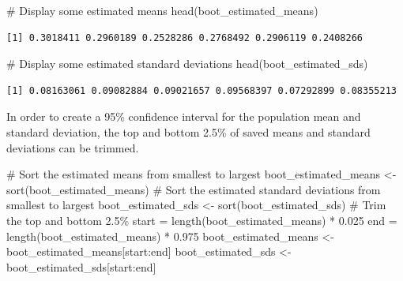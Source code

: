 \documentclass[
  letterpaper,
  DIV=11,
  numbers=noendperiod]{scrartcl}
\newenvironment{Shaded}{\begin{snugshade}}{\end{snugshade}}
\newcommand{\CommentTok}[1]{\textcolor[rgb]{0.37,0.37,0.37}{#1}}
\newcommand{\FloatTok}[1]{\textcolor[rgb]{0.68,0.00,0.00}{#1}}
\newcommand{\FunctionTok}[1]{\textcolor[rgb]{0.28,0.35,0.67}{#1}}
\newcommand{\NormalTok}[1]{\textcolor[rgb]{0.00,0.23,0.31}{#1}}
\newcommand{\OtherTok}[1]{\textcolor[rgb]{0.00,0.23,0.31}{#1}}
\newcommand{\SpecialCharTok}[1]{\textcolor[rgb]{0.37,0.37,0.37}{#1}}
\begin{document}
\begin{Shaded}
\begin{Highlighting}[]
\CommentTok{\# Display some estimated means}
\FunctionTok{head}\NormalTok{(boot\_estimated\_means)}
\end{Highlighting}
\end{Shaded}

\begin{verbatim}
[1] 0.3018411 0.2960189 0.2528286 0.2768492 0.2906119 0.2408266
\end{verbatim}

\begin{Shaded}
\begin{Highlighting}[]
\CommentTok{\# Display some estimated standard deviations}
\FunctionTok{head}\NormalTok{(boot\_estimated\_sds)}
\end{Highlighting}
\end{Shaded}

\begin{verbatim}
[1] 0.08163061 0.09082884 0.09021657 0.09568397 0.07292899 0.08355213
\end{verbatim}

In order to create a 95\% confidence interval for the population mean
and standard deviation, the top and bottom 2.5\% of saved means and
standard deviations can be trimmed.

\begin{Shaded}
\begin{Highlighting}[]
\CommentTok{\# Sort the estimated means from smallest to largest}
\NormalTok{boot\_estimated\_means }\OtherTok{\textless{}{-}} \FunctionTok{sort}\NormalTok{(boot\_estimated\_means)}
\CommentTok{\# Sort the estimated standard deviations from smallest to largest}
\NormalTok{boot\_estimated\_sds }\OtherTok{\textless{}{-}} \FunctionTok{sort}\NormalTok{(boot\_estimated\_sds)}
\CommentTok{\# Trim the top and bottom 2.5\%}
\NormalTok{start }\OtherTok{=} \FunctionTok{length}\NormalTok{(boot\_estimated\_means) }\SpecialCharTok{*} \FloatTok{0.025}
\NormalTok{end }\OtherTok{=} \FunctionTok{length}\NormalTok{(boot\_estimated\_means) }\SpecialCharTok{*} \FloatTok{0.975}
\NormalTok{boot\_estimated\_means }\OtherTok{\textless{}{-}}\NormalTok{ boot\_estimated\_means[start}\SpecialCharTok{:}\NormalTok{end]}
\NormalTok{boot\_estimated\_sds }\OtherTok{\textless{}{-}}\NormalTok{ boot\_estimated\_sds[start}\SpecialCharTok{:}\NormalTok{end]}
\end{Highlighting}
\end{Shaded}
\end{document}
